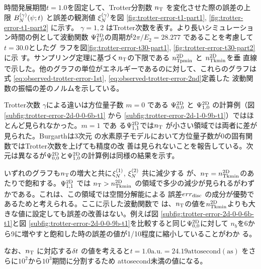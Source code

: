 \documentclass[fontsize=11pt]{jlreq}
\begin{document}
時間発展期間$t=1.0$を固定して、Trotter分割数 $n_{\mathrm{T}}$ を変化させた際の誤差の上限
$B_{N}^{(\gamma)}(\psi;t)$ と誤差の観測値 $\xi_{N}^{(\gamma)}$を図
\ref{fig:trotter-error-t1-part1}, \ref{fig:trotter-error-t1-part2} に示す。
$\gamma=1,2$ はTrotter次数を表す。より長いシミュレーション時間の例として波動関数
$\Psi^{\mathrm{2D}}_{1,0}$の周期が$2\pi/E_2=28.277$ であることを考慮して $t=30.0$としたグ
ラフを図\ref{fig:trotter-error-t30-part1}, \ref{fig:trotter-error-t30-part2}に示
す。サンプリング定理に基づく$n_{\mathrm{T}}$の下限である $n_{\mathrm{Tpmin}}^{\mathrm{2D}}$ と $n_{\mathrm{Tkmin}}^{\mathrm{2D}}$を垂
直線で示した。他のグラフの単位がエネルギーであるのに対して、これらのグラフは式
\eqref{eq:observed-trotter-error-1st}, \eqref{eq:observed-trotter-error-2nd}定義した
波動関数の振幅の差のノルムを示している。

Trotter次数 $\gamma$による違いは方位量子数 $m=0$ である $\Psi^{\mathrm{2D}}_{0,0}$ と
$\Psi^{\mathrm{2D}}_{1,0}$ の計算例（図 \ref{subfig:trotter-error-2d-0-0-6b-t1} から
\ref{subfig:trotter-error-2d-1-0-9b-t1}）ではほとんど見られなかった。$m=1$ であ
る$\Psi^{\mathrm{2D}}_{1,1}$では$n_{\mathrm{T}}$ が小さい領域では両者に差が見られた。Burgarthは3次元
の水素原子モデルにおいて方位量子数が0の固有関数ではTrotter次数を上げても精度の改
善は見られないことを報告している\cite{Burgarth2024.PhysRevResearch.6.043155}。次
元は異なるが$\Psi^{\mathrm{2D}}_{0,0}$と$\Psi^{\mathrm{2D}}_{1,0}$の計算例は同様の結果を示す。

いずれのグラフも$n_{\mathrm{T}}$の増大と共に$\xi_{N}^{(1)}$, $\xi_{N}^{(2)}$ 共に減少する
が、$n_{\mathrm{T}}=n_{\mathrm{Tkmin}}^{\mathrm{2D}}$のあたりで飽和する。$\Psi^{\mathrm{2D}}_{1,1}$ では $n_{\mathrm{T}}>n_{\mathrm{Tkmin}}^{\mathrm{2D}}$
の領域で多少の減少が見られるがわずかである。これは、この領域では空間分解能による
誤差$err_{\mathrm{disc}}$ の成分が優勢であるためと考えられる。ここに示した波動関数で
は、$n_{\mathrm{T}}$の値を$n_{\mathrm{Tkmin}}^{\mathrm{2D}}$よりも大きな値に設定しても誤差の改善はない。例えば図
\ref{subfig:trotter-error-2d-0-0-6b-t1}と図
\ref{subfig:trotter-error-2d-0-0-9b-t1}を比較すると同じ$\Psi^{\mathrm{2D}}_{0,0}$に対して
$n_b$を6から9に増やすと飽和した時の誤差の値が1/10程度に縮小していることがわか
る。

なお、$n_{\mathrm{T}}$ に対応する$\delta t$ の値を考えると$t=1.0 \mathrm{a.u.}=24.19
\mathrm{attosecond} (\mathrm{as})$ をさらに$10^2$から$10^3$期間に分割するため
attosecond未満の値になる。
\end{document}
